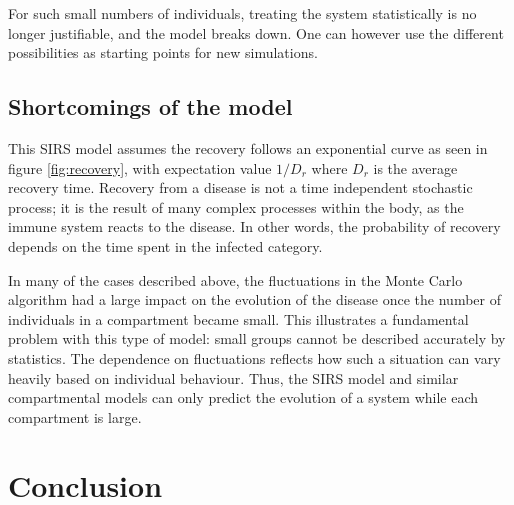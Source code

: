 \documentclass[a4paper,10pt,twocolumn]{article}
\newcommand{\note}[1]{{\color{red}\quad[$\backslash!/$: #1]}}	%
\begin{document}
For such small numbers of individuals, treating the system statistically is no longer justifiable, and the model breaks down. 
One can however use the different possibilities as starting points for new simulations.   




  
\subsection{Shortcomings of the model}

This SIRS model assumes the recovery follows an exponential curve as seen in figure \ref{fig:recovery}, with expectation value $1/D_r$ where $D_r$ is the average recovery time. 
Recovery from a disease is not a time independent stochastic process; it is the result of many complex processes within the body, as the immune system reacts to the disease. 
In other   words, the probability of recovery depends on the time spent in the infected category.  


In many of the cases described above, the fluctuations in the Monte Carlo algorithm had a large impact on the evolution of the disease once the number of individuals in a compartment became small. 
This illustrates a fundamental problem with this type of model: small groups cannot be described accurately by statistics. 
The dependence on fluctuations reflects how such a situation can vary heavily based on individual behaviour. 
Thus, the SIRS model and similar compartmental models can only predict the evolution of a system while each compartment is large. 

%
%
%
\section{Conclusion}
\end{document}

